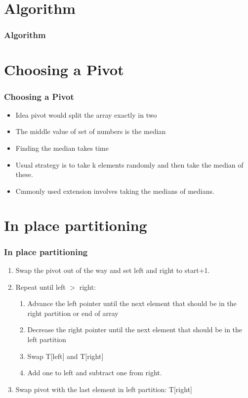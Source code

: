 \documentclass{beamer}
\begin{document}
\section{Algorithm}
\begin{frame}
\frametitle{Algorithm}
\quick
\end{frame}
\section{Choosing a Pivot}
\begin{frame}
\frametitle{Choosing a Pivot}
\begin{itemize}
\item Idea pivot would split the array exactly in two
\item The middle value of set of numbers is the median
\item Finding the median takes time
\item Usual strategy is to take k elements randomly and then take the median of these.
\item Cmmonly used extension involves taking the medians of medians.
\end{itemize}
\end{frame}
\section{In place partitioning}
\begin{frame}[allowframebreaks]
\frametitle{In place partitioning}
\begin{enumerate}
\item Swap the pivot out of the way and set left and right to start+1.
\item Repeat until left $>$ right:
\begin{enumerate}
\item Advance the left pointer until the next element that should be in the right partition or end of array
\item Decrease the right pointer until the next element that should be in the left partition
\item Swap T[left] and T[right]
\item Add one to left and subtract one from right.
\end{enumerate}
\item Swap pivot with the last element in left partition: T[right]
\end{enumerate}
\partit
\end{frame}
\end{document}
